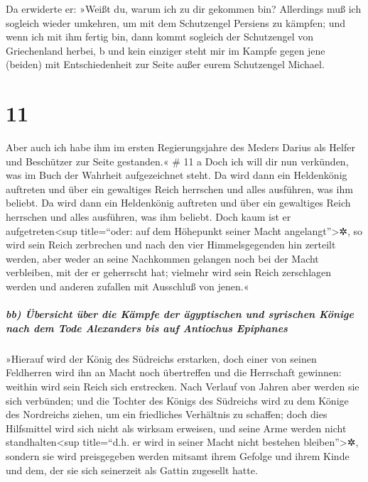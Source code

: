 Da erwiderte er: »Weißt du, warum ich zu dir gekommen
bin? Allerdings muß ich sogleich wieder umkehren, um mit dem Schutzengel
Persiens zu kämpfen; und wenn ich mit ihm fertig bin, dann kommt
sogleich der Schutzengel von Griechenland herbei, b und
kein einziger steht mir im Kampfe gegen jene (beiden) mit
Entschiedenheit zur Seite außer eurem Schutzengel Michael.

\hypertarget{section-10}{%
\section{11}\label{section-10}}

Aber auch ich habe ihm im ersten Regierungsjahre des
Meders Darius als Helfer und Beschützer zur Seite gestanden.« \# 11
a Doch ich will dir nun verkünden, was im Buch der
Wahrheit aufgezeichnet steht. Da wird dann ein Heldenkönig
auftreten und über ein gewaltiges Reich herrschen und alles ausführen,
was ihm beliebt. Da wird dann ein Heldenkönig auftreten
und über ein gewaltiges Reich herrschen und alles ausführen, was ihm
beliebt. Doch kaum ist er aufgetreten\textless sup
title=``oder: auf dem Höhepunkt seiner Macht angelangt''\textgreater✲,
so wird sein Reich zerbrechen und nach den vier Himmelsgegenden hin
zerteilt werden, aber weder an seine Nachkommen gelangen noch bei der
Macht verbleiben, mit der er geherrscht hat; vielmehr wird sein Reich
zerschlagen werden und anderen zufallen mit Ausschluß von jenen.«

\hypertarget{bb-uxfcbersicht-uxfcber-die-kuxe4mpfe-der-uxe4gyptischen-und-syrischen-kuxf6nige-nach-dem-tode-alexanders-bis-auf-antiochus-epiphanes}{%
\subparagraph{bb) Übersicht über die Kämpfe der ägyptischen und
syrischen Könige nach dem Tode Alexanders bis auf Antiochus
Epiphanes}\label{bb-uxfcbersicht-uxfcber-die-kuxe4mpfe-der-uxe4gyptischen-und-syrischen-kuxf6nige-nach-dem-tode-alexanders-bis-auf-antiochus-epiphanes}}

»Hierauf wird der König des Südreichs erstarken, doch
einer von seinen Feldherren wird ihn an Macht noch übertreffen und die
Herrschaft gewinnen: weithin wird sein Reich sich erstrecken.
Nach Verlauf von Jahren aber werden sie sich verbünden;
und die Tochter des Königs des Südreichs wird zu dem Könige des
Nordreichs ziehen, um ein friedliches Verhältnis zu schaffen; doch dies
Hilfsmittel wird sich nicht als wirksam erweisen, und seine Arme werden
nicht standhalten\textless sup title=``d.h. er wird in seiner Macht
nicht bestehen bleiben''\textgreater✲, sondern sie wird preisgegeben
werden mitsamt ihrem Gefolge und ihrem Kinde und dem, der sie sich
seinerzeit als Gattin zugesellt hatte.

